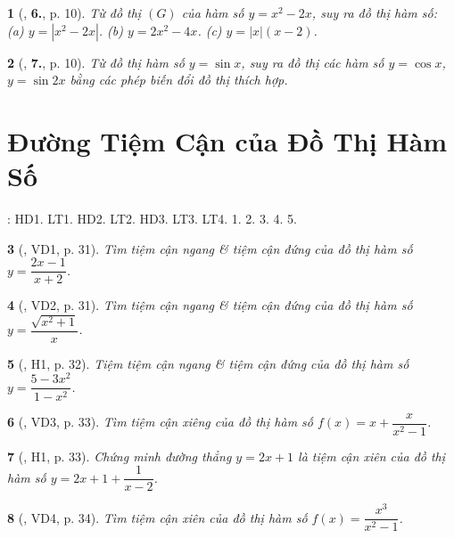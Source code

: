 \documentclass{article}
\newtheorem{baitoan}{}
\begin{document}
\begin{baitoan}[\cite{TLCT_giai_tich_12}, \textbf{6.}, p. 10]
	Từ đồ thị $(G)$ của hàm số $y = x^2 - 2x$, suy ra đồ thị hàm số: (a) $y = |x^2 - 2x|$. (b) $y = 2x^2 - 4x$. (c) $y = |x|(x - 2)$.
\end{baitoan}

\begin{baitoan}[\cite{TLCT_giai_tich_12}, \textbf{7.}, p. 10]
	Từ đồ thị hàm số $y = \sin x$, suy ra đồ thị các hàm số $y = \cos x$, $y = \sin 2x$ bằng các phép biến đổi đồ thị thích hợp.
\end{baitoan}


\section{Đường Tiệm Cận của Đồ Thị Hàm Số}
\cite[Chap. I, \S3, pp. 21--27]{SGK_Toan_12_Canh_Dieu_tap_1}: HD1. LT1. HD2. LT2. HD3. LT3. LT4. 1. 2. 3. 4. 5.

\begin{baitoan}[\cite{SGK_Toan_12_giai_tich_nang_cao}, VD1, p. 31]
	Tìm tiệm cận ngang \& tiệm cận đứng của đồ thị hàm số $y = \dfrac{2x - 1}{x + 2}$.
\end{baitoan}

\begin{baitoan}[\cite{SGK_Toan_12_giai_tich_nang_cao}, VD2, p. 31]
	Tìm tiệm cận ngang \& tiệm cận đứng của đồ thị hàm số $y = \dfrac{\sqrt{x^2 + 1}}{x}$.
\end{baitoan}

\begin{baitoan}[\cite{SGK_Toan_12_giai_tich_nang_cao}, H1, p. 32]
	Tiệm tiệm cận ngang \& tiệm cận đứng của đồ thị hàm số $y = \dfrac{5 - 3x^2}{1 - x^2}$.
\end{baitoan}

\begin{baitoan}[\cite{SGK_Toan_12_giai_tich_nang_cao}, VD3, p. 33]
	Tìm tiệm cận xiêng của đồ thị hàm số $f(x) = x + \dfrac{x}{x^2 - 1}$.
\end{baitoan}

\begin{baitoan}[\cite{SGK_Toan_12_giai_tich_nang_cao}, H1, p. 33]
	Chứng minh đường thẳng $y = 2x + 1$ là tiệm cận xiên của đồ thị hàm số $y = 2x + 1 + \dfrac{1}{x - 2}$.
\end{baitoan}

\begin{baitoan}[\cite{SGK_Toan_12_giai_tich_nang_cao}, VD4, p. 34]
	Tìm tiệm cận xiên của đồ thị hàm số $f(x) = \dfrac{x^3}{x^2 - 1}$.
\end{baitoan}
\end{document}
